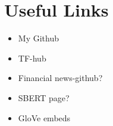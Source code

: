\chapter{Useful Links}\label{appendix:A}

\begin{itemize}
    \item My Github
    \item TF-hub
    \item Financial news-github? 
    \item SBERT page? 
    \item GloVe embeds
\end{itemize}
